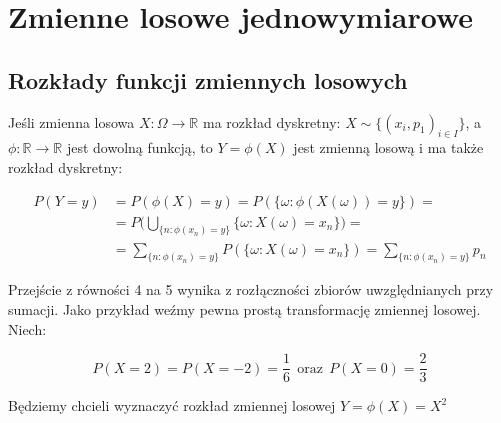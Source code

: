 \documentclass{article}
\begin{document}
\section{Zmienne losowe jednowymiarowe}

\subsection{Rozkłady funkcji zmiennych losowych}

Jeśli zmienna losowa \(X : \Omega \rightarrow \mathbb{R}\) ma rozkład dyskretny: \(X \sim \{(x_{i}, p_{1})_{i \in I}\}\),
a \(\phi: \mathbb{R} \rightarrow \mathbb{R}\) jest dowolną funkcją, to \(Y = \phi(X)\)
 jest zmienną losową i ma także rozkład dyskretny:

\begin{equation*}
\begin{split}
        P(Y=y) & = P(\phi(X) = y) = P(\{\omega: \phi(X(\omega))=y\}) = \\
        & = P \Bigg(\bigcup_{\{n: \phi(x_n) = y\}} \{\omega:X(\omega) = x_{n}\}\Bigg) = \\
        & = \sum_{\{n: \phi(x_n) = y\}} P(\{\omega: X(\omega) = x_{n}\}) = \sum_{\{n: \phi(x_n) = y\}} p_n
\end{split}
\end{equation*}

Przejście z równości 4 na 5 wynika z rozłączności zbiorów uwzględnianych przy sumacji.
Jako przykład weźmy pewna prostą transformację zmiennej losowej. Niech:

\begin{equation*}
    P(X=2) = P(X = -2) = \frac{1}{6} \ \ \mbox{oraz} \ \ P(X=0) = \frac{2}{3} 
\end{equation*}

Będziemy chcieli wyznaczyć rozkład zmiennej losowej \(Y = \phi(X) = X^2\)
\end{document}
